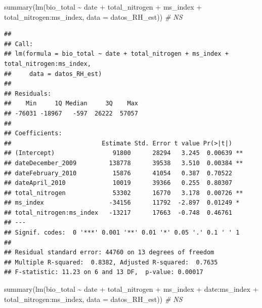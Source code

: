 \documentclass[
]{book}
\newenvironment{Shaded}{\begin{snugshade}}{\end{snugshade}}
\newcommand{\AttributeTok}[1]{\textcolor[rgb]{0.77,0.63,0.00}{#1}}
\newcommand{\CommentTok}[1]{\textcolor[rgb]{0.56,0.35,0.01}{\textit{#1}}}
\newcommand{\FunctionTok}[1]{\textcolor[rgb]{0.00,0.00,0.00}{#1}}
\newcommand{\NormalTok}[1]{#1}
\newcommand{\SpecialCharTok}[1]{\textcolor[rgb]{0.00,0.00,0.00}{#1}}
\begin{document}
\begin{Shaded}
\begin{Highlighting}[]
\FunctionTok{summary}\NormalTok{(}\FunctionTok{lm}\NormalTok{(bio\_total }\SpecialCharTok{\textasciitilde{}}\NormalTok{ date }\SpecialCharTok{+}\NormalTok{ total\_nitrogen }\SpecialCharTok{+}\NormalTok{ ms\_index }\SpecialCharTok{+}\NormalTok{ total\_nitrogen}\SpecialCharTok{:}\NormalTok{ms\_index, }\AttributeTok{data =}\NormalTok{ datos\_RH\_est))  }\CommentTok{\# NS}
\end{Highlighting}
\end{Shaded}

\begin{verbatim}
## 
## Call:
## lm(formula = bio_total ~ date + total_nitrogen + ms_index + total_nitrogen:ms_index, 
##     data = datos_RH_est)
## 
## Residuals:
##    Min     1Q Median     3Q    Max 
## -76031 -18967   -597  26222  57057 
## 
## Coefficients:
##                         Estimate Std. Error t value Pr(>|t|)   
## (Intercept)                91800      28294   3.245  0.00639 **
## dateDecember_2009         138778      39538   3.510  0.00384 **
## dateFebruary_2010          15876      41054   0.387  0.70522   
## dateApril_2010             10019      39366   0.255  0.80307   
## total_nitrogen             53302      16770   3.178  0.00726 **
## ms_index                  -34156      11792  -2.897  0.01249 * 
## total_nitrogen:ms_index   -13217      17663  -0.748  0.46761   
## ---
## Signif. codes:  0 '***' 0.001 '**' 0.01 '*' 0.05 '.' 0.1 ' ' 1
## 
## Residual standard error: 44760 on 13 degrees of freedom
## Multiple R-squared:  0.8382, Adjusted R-squared:  0.7635 
## F-statistic: 11.23 on 6 and 13 DF,  p-value: 0.00017
\end{verbatim}

\begin{Shaded}
\begin{Highlighting}[]
\FunctionTok{summary}\NormalTok{(}\FunctionTok{lm}\NormalTok{(bio\_total }\SpecialCharTok{\textasciitilde{}}\NormalTok{ date }\SpecialCharTok{+}\NormalTok{ total\_nitrogen }\SpecialCharTok{+}\NormalTok{ ms\_index }\SpecialCharTok{+}\NormalTok{ date}\SpecialCharTok{:}\NormalTok{ms\_index }\SpecialCharTok{+}\NormalTok{ total\_nitrogen}\SpecialCharTok{:}\NormalTok{ms\_index, }\AttributeTok{data =}\NormalTok{ datos\_RH\_est)) }\CommentTok{\# NS}
\end{Highlighting}
\end{Shaded}
\end{document}
